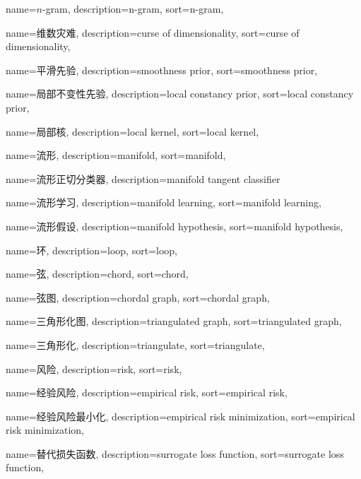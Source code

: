 {
  name=$n$-gram,
  description={n-gram},
  sort={n-gram},
}

{
  name=维数灾难,
  description={curse of dimensionality},
  sort={curse of dimensionality},
}

{
  name=平滑先验,
  description={smoothness prior},
  sort={smoothness prior},
}

{
  name=局部不变性先验,
  description={local constancy prior},
  sort={local constancy prior},
}

{
  name=局部核,
  description={local kernel},
  sort={local kernel},
}

{
  name=流形,
  description={manifold},
  sort={manifold},
}

{
  name=流形正切分类器,
  description={manifold tangent classifier}
}

{
  name=流形学习,
  description={manifold learning},
  sort={manifold learning},
}

{
  name=流形假设,
  description={manifold hypothesis},
  sort={manifold hypothesis},
}

{
  name=环,
  description={loop},
  sort={loop},
}

{
  name=弦,
  description={chord},
  sort={chord},
}

{
  name=弦图,
  description={chordal graph},
  sort={chordal graph},
}

{
  name=三角形化图,
  description={triangulated graph},
  sort={triangulated graph},
}

{
	name=三角形化,
	description={triangulate},
	sort={triangulate},
}

{
  name=风险,
  description={risk},
  sort={risk},
}

{
  name=经验风险,
  description={empirical risk},
  sort={empirical risk},
}

{
  name=经验风险最小化,
  description={empirical risk minimization},
  sort={empirical risk minimization},
}

{
  name=替代损失函数,
  description={surrogate loss function},
  sort={surrogate loss function},
}

